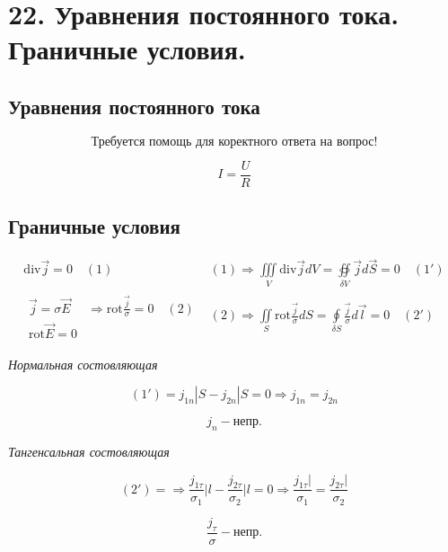 \newpage

\section*{22. Уравнения постоянного тока. Граничные условия.}
 
\subsection*{Уравнения постоянного тока}

\[\boxed{\text{Требуется помощь для коректного ответа на вопрос!}}\]

\[I=\frac{U}{R} \]

\subsection*{Граничные условия}
\[
\begin{array}{l|l}
    \mathrm{div}\vec{j}=0 \quad (1)& (1)\Rightarrow\underset{V}{\iiint}\mathrm{div}\vec{j}dV=\underset{\delta V}{\oiint}\vec{j}d\vec{S}=0 \quad (1') \\
    
    \begin{array}{l|l}
        \vec{j}=\sigma\vec{E} &\Rightarrow \mathrm{rot} \frac{\vec{j}}{\sigma}=0 \quad (2)  \\
        \mathrm{rot}\vec{E}=0 
    \end{array}    & (2)\Rightarrow \underset{S}{ \iint}\mathrm{rot} \frac{\vec{j}}{\sigma}dS=\underset{\delta S}{\oint} \frac{\vec{j}}{\sigma} d\vec{l}=0\quad (2')  
    
\end{array}
\]

\textit{Нормальная состовляющая}


\[(1')=j_{1n}|S-j_{2n}|S=0\Rightarrow j_{1n}=j_{2n} \]

\[\boxed{j_n-\text{непр.}}\]

\textit{Тангенсальная состовляющая}


\[(2')=\Rightarrow \frac{j_{1\tau}}{\sigma_1}\bigg|l-\frac{j_{2\tau}}{\sigma_2}\bigg|l=0\Rightarrow \frac{j_{1\tau}|}{\sigma_1}=\frac{j_{2\tau}|}{\sigma_2}\]

\[\boxed{\frac{j_{\tau}}{\sigma} -\text{непр.}}\]
